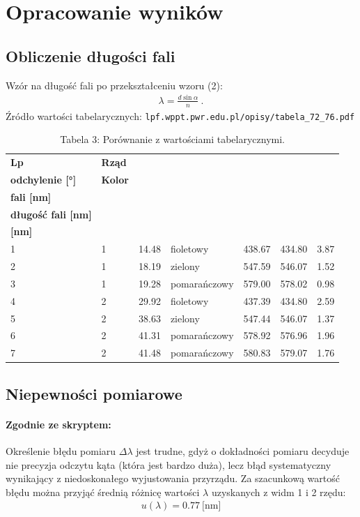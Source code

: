 \documentclass{fizykalab}
\begin{document}
{\newpage

\section*{Opracowanie wyników}
\subsection*{Obliczenie długości fali}
\par 
Wzór na długość fali po przekształceniu wzoru (2):
\begin{gather*}
	\lambda  = \frac{d \sin{\alpha}}{n} \ .
	\tag{3} 
\end{gather*}
Źródło wartości tabelarycznych: \verb|lpf.wppt.pwr.edu.pl/opisy/tabela_72_76.pdf|
\begin{table}[H]
	\centering
	\begin{tabular}{|l|l|l|l|l|l|l|}
		\hline
		\textbf{Lp} & \textbf{Rząd} & \makecell{\rule{0pt}{1em} \textbf{Średnie} \\ \textbf{odchylenie [°]}} & \textbf{Kolor} & \makecell{\textbf{Długość} \\ \textbf{fali [nm]}} & \makecell{\textbf{Przewidywana} \\  \textbf{długość fali [nm]}} & \makecell{\textbf{Różnica} \\ \textbf{[nm]}} \\ \hline\hline
		1 & 1 & 14.48 & fioletowy & 438.67 & 434.80 & 3.87 \\ \hline
		2 & 1 & 18.19 & zielony & 547.59 & 546.07 & 1.52 \\ \hline
		3 & 1 & 19.28 & pomarańczowy & 579.00 & 578.02 & 0.98 \\ \hline\hline
		4 & 2 & 29.92 & fioletowy & 437.39 & 434.80 & 2.59 \\ \hline
		5 & 2 & 38.63 & zielony & 547.44 & 546.07 & 1.37 \\ \hline
		6 & 2 & 41.31 & pomarańczowy & 578.92 & 576.96 & 1.96 \\ \hline
		7 & 2 & 41.48 & pomarańczowy & 580.83 & 579.07 & 1.76 \\ \hline
	\end{tabular}
	\caption*{Tabela 3: Porównanie z wartościami tabelarycznymi.}
\end{table}


\subsection*{Niepewności pomiarowe}
\paragraph*{Zgodnie ze skryptem: }
Określenie błędu pomiaru $\Delta \lambda$ jest trudne, gdyż o dokładności pomiaru decyduje nie
precyzja odczytu kąta (która jest bardzo duża), lecz błąd systematyczny wynikający
z niedoskonałego wyjustowania przyrządu. Za szacunkową wartość błędu można przyjąć
średnią różnicę wartości $\lambda$ uzyskanych z widm 1 i 2 rzędu:
\begin{gather*}
	u(\lambda) = 0.77 \ \text{[nm]}
\end{gather*}

}
\end{document}

